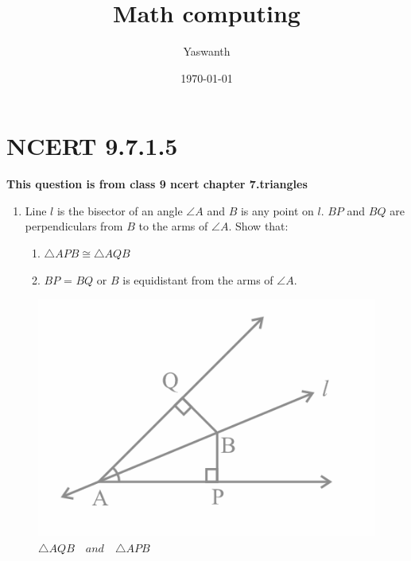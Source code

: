 \documentclass[11pt, a4paper]{article}
\title{ Math computing}
\author{ Yaswanth }
\date{\today}
\begin{document}
\vspace{-\baselineskip}
\maketitle

\section*{NCERT 9.7.1.5}

\textbf{This question is from class 9 ncert chapter 7.triangles}
\begin{enumerate}
    \item Line $l$ is the bisector of an angle $\angle A$ and $B$ is any point on $l$. $BP$ and $BQ$ are perpendiculars from $B$ to the arms of $\angle A$. Show that:
%
\begin{enumerate}
    \item $\triangle  APB \cong \triangle AQB$  
    \item $BP$ = $BQ$ or $B$ is equidistant from the arms of $\angle A$.
 \end{enumerate}
\end{enumerate}
\begin{figure}[H]
    \centering
    \includegraphics[width=1\columnwidth]{fig_mc.png}
    \caption{$\triangle AQB \hspace{12pt} and \hspace{12pt} \triangle APB$}
    \label{fig:math_comp1}
\end{figure}
\pagebreak
\end{document}
